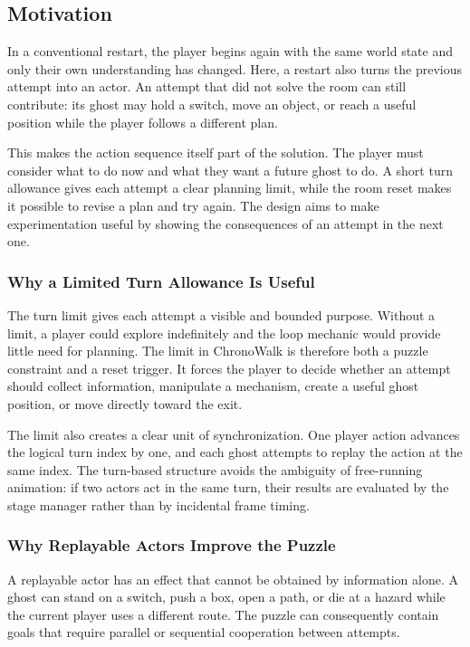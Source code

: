 \subsection{Motivation}

In a conventional restart, the player begins again with the same world state and only their own understanding has changed. Here, a restart also turns the previous attempt into an actor. An attempt that did not solve the room can still contribute: its ghost may hold a switch, move an object, or reach a useful position while the player follows a different plan.

This makes the action sequence itself part of the solution. The player must consider what to do now and what they want a future ghost to do. A short turn allowance gives each attempt a clear planning limit, while the room reset makes it possible to revise a plan and try again. The design aims to make experimentation useful by showing the consequences of an attempt in the next one.

\subsubsection{Why a Limited Turn Allowance Is Useful}

The turn limit gives each attempt a visible and bounded purpose. Without a limit, a player could explore indefinitely and the loop mechanic would provide little need for planning. The limit in ChronoWalk is therefore both a puzzle constraint and a reset trigger. It forces the player to decide whether an attempt should collect information, manipulate a mechanism, create a useful ghost position, or move directly toward the exit.

The limit also creates a clear unit of synchronization. One player action advances the logical turn index by one, and each ghost attempts to replay the action at the same index. The turn-based structure avoids the ambiguity of free-running animation: if two actors act in the same turn, their results are evaluated by the stage manager rather than by incidental frame timing.

\subsubsection{Why Replayable Actors Improve the Puzzle}

A replayable actor has an effect that cannot be obtained by information alone. A ghost can stand on a switch, push a box, open a path, or die at a hazard while the current player uses a different route. The puzzle can consequently contain goals that require parallel or sequential cooperation between attempts.

